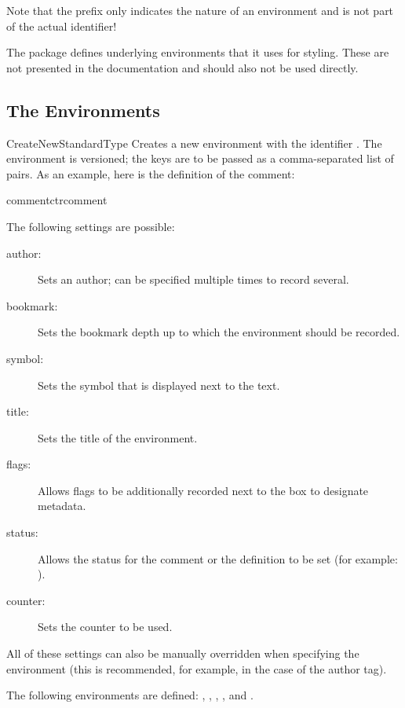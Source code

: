 \documentclass{sopra-base}
\begin{document}
Note that the prefix  only indicates the nature of an environment and is not part of the actual identifier!\par{}
The package defines underlying environments that it uses for styling.
These are not presented in the documentation and should also not be
used directly.

\subsection{The Environments}
\begin{command}{CreateNewStandardType}{}
    Creates a new environment with the identifier . The environment is versioned; the keys are to be passed as a comma-separated list of  pairs. As an example, here is the definition
    of the comment:
\begin{plainlatex}[morekeywords={[5]{\\CreateNewStandardType,\\footnotesize,\\faCommentsO}}]
    {comment}{ctrcomment}
\end{plainlatex}
The following settings are possible: \begin{description}
    \item[author:] Sets an author; can be specified multiple times to record several.
    \item[bookmark:] Sets the bookmark depth up to which the environment should be recorded.
    \item[symbol:] Sets the symbol that is displayed next to the text.
    \item[title:] Sets the title of the environment.
    \item[flags:] Allows flags to be additionally recorded next to the box to designate metadata.
    \item[status:] Allows the status for the comment or the definition to be set (for example: ).
    \item[counter:] Sets the counter to be used.
\end{description}
All of these settings can also be manually overridden when specifying the environment (this is recommended, for example, in the case of the author tag).
\end{command}

The following environments are defined: , , , ,  and .
\end{document}
